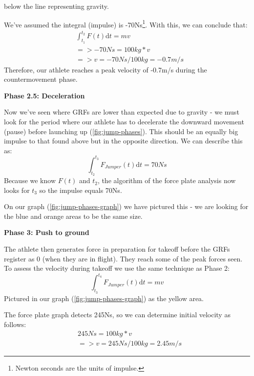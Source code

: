 below the line representing gravity.
\par
We've assumed the integral (impulse) is -70Ns\footnote{Newton seconds are the units of impulse.}. 
With this, we can conclude that:
\begin{align*}
& \int_{t_1}^{t_2} F(t) \mathrm{d}t = m v \\
&=> -70 N s = 100kg * v \\
&=> v = -70 N s / 100kg = -0.7 m/s
\end{align*}
Therefore, our athlete reaches a peak velocity of -0.7m/s during the countermovement phase.
\par
\textbf{Phase 2.5: Deceleration}
\par
Now we've seen where GRFs are lower than expected due to gravity - we must look for the period
where our athlete has to decelerate the downward movement (pause) before launching up (\cref{fig:jump-phases}).
This should be an equally big impulse to that found above but in the opposite direction.
We can describe this as:
\[\displaystyle \int_{t_2}^{t_3} F_{Jumper}(t) \mathrm{d}t = 70 Ns\]
Because we know $F(t)$ and $t_2$, the algorithm of the force plate analysis
now looks for $t_3$ so the impulse equals 70Ns.
\par
On our graph (\cref{fig:jump-phases-graph}) we have pictured this -
we are looking for the blue and orange areas to be the same size.
\par
\textbf{Phase 3: Push to ground}
\par
The athlete then generates force in preparation for takeoff before the GRFs register as 0
(when they are in flight). They reach some of the peak forces seen.
To assess the velocity during takeoff we use the same technique as Phase 2:
\[
\displaystyle
\int_{t_3}^{t_4} F_{Jumper}(t) \mathrm{d}t = mv	
\]
Pictured in our graph (\cref{fig:jump-phases-graph}) as the yellow area.
\pagebreak

The force plate graph detects 245Ns, so we can determine initial velocity as follows:
\vspace{-3mm}
\begin{align*}
	& 245 N s = 100kg * v \\
	&=> v = 245 N s / 100kg = 2.45 m/s
\end{align*}
\vspace{-5mm}

